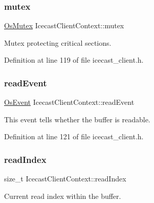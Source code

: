 \mbox{\label{structIcecastClientContext_a6010fc4c4397ce78077161827ca96e13}} 
\subsubsection{\texorpdfstring{mutex}{mutex}}
{\footnotesize\ttfamily \hyperlink{structOsMutex}{Os\+Mutex} Icecast\+Client\+Context\+::mutex}



Mutex protecting critical sections. 



Definition at line 119 of file icecast\+\_\+client.\+h.

\mbox{\label{structIcecastClientContext_aad69417e9a2e8e5cd2b8e9543b2f7f4f}} 
\subsubsection{\texorpdfstring{read\+Event}{readEvent}}
{\footnotesize\ttfamily \hyperlink{structOsEvent}{Os\+Event} Icecast\+Client\+Context\+::read\+Event}



This event tells whether the buffer is readable. 



Definition at line 121 of file icecast\+\_\+client.\+h.

\mbox{\label{structIcecastClientContext_a491b0ef46c2747c4ef269603df92b208}} 
\subsubsection{\texorpdfstring{read\+Index}{readIndex}}
{\footnotesize\ttfamily size\+\_\+t Icecast\+Client\+Context\+::read\+Index}



Current read index within the buffer. 



